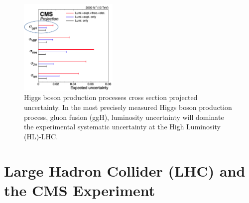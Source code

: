 



\begin{figure}[!htp]
\centering
\includegraphics[width=0.42\textwidth]{ashish_thesis/lumi_precision.png}
\caption{%
   Higgs boson production processes cross section projected uncertainty. In the most precisely measured Higgs boson production process, gluon fusion (ggH), luminosity uncertainty will dominate the experimental systematic uncertainty at the High Luminosity (HL)-LHC.
}
\label{fig:lum_unc}
\end{figure}


\section{Large Hadron Collider (LHC) and the CMS Experiment}

